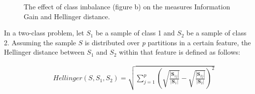 \begin{figure}[h]
\centering
{}                
\caption{The effect of class imbalance (figure b) on the measures Information Gain and Hellinger distance.}
\end{figure}

In a two-class problem, let \(S_1\) be a sample of class 1 and \(S_2\) be a sample of class 2. Assuming the sample \(S\) is distributed over \textit{p} partitions in a certain feature, the Hellinger distance between \(S_1\) and \(S_2\) within that feature is defined as follows:

\begin{eqnarray}
&&Hellinger \left (S,S_1,S_2 \right)=\sqrt{\sum_{j=1}^p {\left(\sqrt{\frac{|\mathbf{S}_{1j}|}{|\mathbf{S}_1|}} - \sqrt{\frac{|\mathbf{S}_{2j}|}{|\mathbf{S}_2|}} \right )^2}}
\end{eqnarray}

